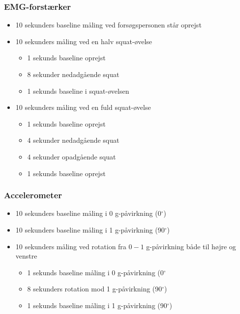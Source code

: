 \subsubsection{EMG-forstærker}
\begin{itemize}
\item 10 sekunders baseline måling ved forsøgspersonen står oprejst
\item 10 sekunders måling ved en halv squat-øvelse
	\begin{itemize}
	\item 1 sekunds baseline oprejst
	\item 8 sekunder nedadgående squat 
	\item 1 sekunds baseline i squat-øvelsen
	\end{itemize}
\item 10 sekunders måling ved en fuld squat-øvelse
	\begin{itemize}
	\item 1 sekunds baseline oprejst
	\item 4 sekunder nedadgående squat 
	\item 4 sekunder opadgående squat
	\item 1 sekunds baseline oprejst
	\end{itemize}
\end{itemize}

\subsubsection{Accelerometer}
\begin{itemize}
\item 10 sekunders baseline måling i 0 g-påvirkning (0$^{\circ}$)
\item 10 sekunders baseline måling i 1 g-påvirkning (90$^{\circ}$)
\item 10 sekunders måling ved rotation fra $0-1$ g-påvirkning både til højre og venstre
	\begin{itemize}
	\item 1 sekunds baseline måling i 0 g-påvirkning (0$^{\circ}$
	\item 8 sekunders rotation mod 1 g-påvirkning (90$^{\circ}$)
	\item 1 sekunds baseline måling i 1 g-påvirkning (90$^{\circ}$)
	\end{itemize}
\end{itemize}

